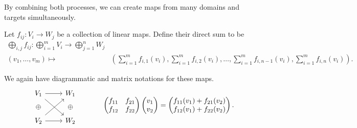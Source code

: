 By combining both processes, we can create maps from many domains and targets simultaneously. 
\begin{definition}
Let $f_{ij}: V_i\to W_j$ be a collection of linear maps. Define their direct sum to be 
\begin{align*}
\bigoplus_{i,j} f_{ij}: \bigoplus_{i=1}^m V_i\to\bigoplus_{j=1}^n W_j\\
(v_1, \ldots, v_m)\mapsto & \left(\sum_{i=1}^mf_{i,1}(v_i), \sum_{i=1}^mf_{i,2}(v_i), \ldots, \sum_{i=1}^mf_{i,{n-1}}(v_i), \sum_{i=1}^mf_{i,{n}}(v_i)\right).
\end{align*}
\end{definition}
We again have diagrammatic and matrix notations for these maps. 
\[
\begin{tikzcd}[row sep= tiny]
V_1\arrow{r} \arrow{rdd}  & W_1\\
\oplus & \oplus \\
V_2\arrow{r}  \arrow{ruu} & W_2
\end{tikzcd}\;\;\;\;\;\;\;\;\;\;\;\;
\begin{pmatrix}
f_{11}& f_{21}\\f_{12} & f_{22}
\end{pmatrix}
\begin{pmatrix} v_1 \\ v_2\end{pmatrix} = \begin{pmatrix} f_{11}(v_1)+f_{21}(v_2)\\ f_{12}(v_1)+f_{22}(v_2)\end{pmatrix}.
\]


